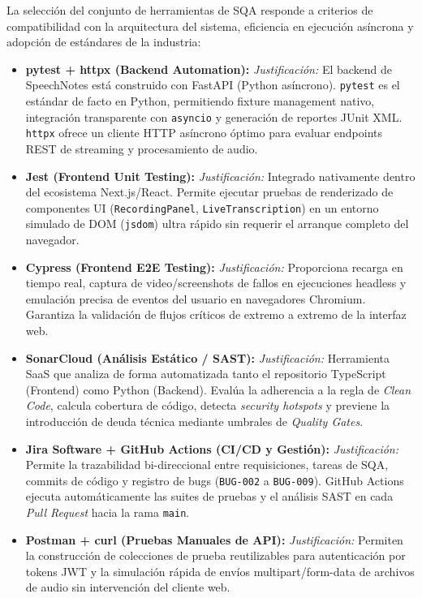 La selección del conjunto de herramientas de SQA responde a criterios de compatibilidad con la arquitectura del sistema, eficiencia en ejecución asíncrona y adopción de estándares de la industria:

\begin{itemize}
    \item \textbf{pytest + httpx (Backend Automation):} \textit{Justificación:} El backend de SpeechNotes está construido con FastAPI (Python asíncrono). \texttt{pytest} es el estándar de facto en Python, permitiendo fixture management nativo, integración transparente con \texttt{asyncio} y generación de reportes JUnit XML. \texttt{httpx} ofrece un cliente HTTP asíncrono óptimo para evaluar endpoints REST de streaming y procesamiento de audio.
    \item \textbf{Jest (Frontend Unit Testing):} \textit{Justificación:} Integrado nativamente dentro del ecosistema Next.js/React. Permite ejecutar pruebas de renderizado de componentes UI (\texttt{RecordingPanel}, \texttt{LiveTranscription}) en un entorno simulado de DOM (\texttt{jsdom}) ultra rápido sin requerir el arranque completo del navegador.
    \item \textbf{Cypress (Frontend E2E Testing):} \textit{Justificación:} Proporciona recarga en tiempo real, captura de video/screenshots de fallos en ejecuciones headless y emulación precisa de eventos del usuario en navegadores Chromium. Garantiza la validación de flujos críticos de extremo a extremo de la interfaz web.
    \item \textbf{SonarCloud (Análisis Estático / SAST):} \textit{Justificación:} Herramienta SaaS que analiza de forma automatizada tanto el repositorio TypeScript (Frontend) como Python (Backend). Evalúa la adherencia a la regla de \textit{Clean Code}, calcula cobertura de código, detecta \textit{security hotspots} y previene la introducción de deuda técnica mediante umbrales de \textit{Quality Gates}.
    \item \textbf{Jira Software + GitHub Actions (CI/CD y Gestión):} \textit{Justificación:} Permite la trazabilidad bi-direccional entre requisiciones, tareas de SQA, commits de código y registro de bugs (\texttt{BUG-002} a \texttt{BUG-009}). GitHub Actions ejecuta automáticamente las suites de pruebas y el análisis SAST en cada \textit{Pull Request} hacia la rama \texttt{main}.
    \item \textbf{Postman + curl (Pruebas Manuales de API):} \textit{Justificación:} Permiten la construcción de colecciones de prueba reutilizables para autenticación por tokens JWT y la simulación rápida de envíos multipart/form-data de archivos de audio sin intervención del cliente web.
\end{itemize}

